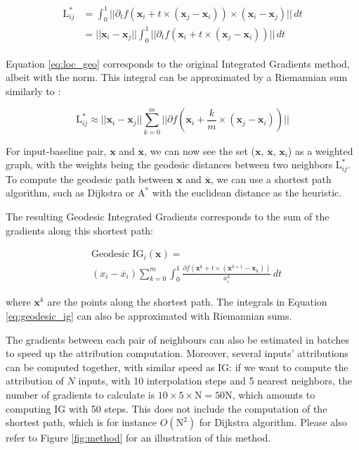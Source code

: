 \begin{align}
\begin{split}
    \textrm{L}^*_{ij} &= \int_0^1 ||\partial_t f(\textbf{x}_i + t \times (\textbf{x}_j - \textbf{x}_i)) \times (\textbf{x}_i - \textbf{x}_j) || \, dt \\
    &= ||\textbf{x}_i - \textbf{x}_j|| \int_0^1 ||\partial_t f(\textbf{x}_i + t \times (\textbf{x}_j - \textbf{x}_i))|| \, dt
\end{split}
\label{eq:loc_geo}
\end{align}

Equation \ref{eq:loc_geo} corresponds to the original Integrated Gradients method, albeit with the norm. This integral can be approximated by a Riemannian sum similarly to \cite{sundararajan2017axiomatic}: 

\begin{equation}
    \textrm{L}^*_{ij} \approx ||\textbf{x}_i - \textbf{x}_j|| \sum_{k=0}^m || \partial f(\textbf{x}_i + \frac{k}{m} \times (\textbf{x}_j - \textbf{x}_i))||
\label{eq:log_geo_approx}
\end{equation}

For input-baseline pair, $\textbf{x}$ and $\overline{\textbf{x}}$, we can now see the set ($\textbf{x}$, $\overline{\textbf{x}}$, $\textbf{x}_i$) as a weighted graph, with the weights being the geodesic distances between two neighbors $\textrm{L}^*_{ij}$. To compute the geodesic path between $\textbf{x}$ and $\overline{\textbf{x}}$, we can use a shortest path algorithm, such as Dijkstra or $\textrm{A}^*$ with the euclidean distance as the heuristic.

The resulting Geodesic Integrated Gradients corresponds to the sum of the gradients along this shortest path:

\begin{equation}
\begin{split}
    & \textrm{Geodesic IG}_i(\textbf{x}) = \\ & (x_i - \overline{x}_i) \sum_{k=0}^m \int_0^1 \frac{\partial f(\textbf{x}^k + t \times (\textbf{x}^{k+1} - \textbf{x}_k))}{x^k_i} \, dt
\end{split}
\label{eq:geodesic_ig}
\end{equation}

where $\textbf{x}^k$ are the points along the shortest path. The integrals in Equation \ref{eq:geodesic_ig} can also be approximated with Riemannian sums.

The gradients between each pair of neighbours can also be estimated in batches to speed up the attribution computation. Moreover, several inputs' attributions can be computed together, with similar speed as IG: if we want to compute the attribution of $N$ inputs, with 10 interpolation steps and 5 nearest neighbors, the number of gradients to calculate is $10 \times 5 \times \textrm{N} = 50 \textrm{N}$, which amounts to computing IG with 50 steps. This does not include the computation of the shortest path, which is for instance $O(\textrm{N}^2)$ for Dijkstra algorithm. Please also refer to Figure \ref{fig:method} for an illustration of this method.

